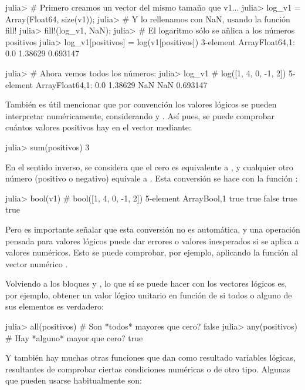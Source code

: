 ﻿\documentclass[spanish]{article}
\begin{document}
julia> # Primero creamos un vector del mismo tamaño que v1...
julia> log_v1 = Array(Float64, size(v1));
julia> # Y lo rellenamos con NaN, usando la función fill!
julia> fill!(log_v1, NaN);
julia> # El logaritmo sólo se añlica a los números positivos
julia> log_v1[positivos] = log(v1[positivos])
3-element Array{Float64,1}:
 0.0
 1.38629
 0.693147

julia> # Ahora vemos todos los números:
julia> log_v1   # log([1, 4, 0, -1, 2])
5-element Array{Float64,1}:
   0.0
   1.38629
 NaN
 NaN
   0.693147

También es útil mencionar que por convención los valores lógicos se pueden interpretar numéricamente, considerando  y . Así pues, se puede comprobar cuántos valores positivos hay en el vector  mediante:

julia> sum(positivos)
3

En el sentido inverso, se considera que el cero es equivalente a , y cualquier otro número (positivo o negativo) equivale a . Esta conversión se hace con la función :

julia> bool(v1)   # bool([1, 4, 0, -1, 2])
5-element Array{Bool,1}
  true
  true
 false
  true
  true

Pero es importante señalar que esta conversión no es automática, y una operación pensada para valores lógicos puede dar errores o valores inesperados si se aplica a valores numéricos. Esto se puede comprobar, por ejemplo, aplicando la función  al vector numérico .

Volviendo a los bloques  y , lo que sí se puede hacer con los vectores lógicos es, por ejemplo, obtener un valor lógico unitario en función de si todos o alguno de sus elementos es verdadero:

julia> all(positivos) # Son *todos* mayores que cero?
false
julia> any(positivos) # Hay *alguno* mayor que cero?
true

Y también hay muchas otras funciones que dan como resultado variables lógicas, resultantes de comprobar ciertas condiciones numéricas o de otro tipo. Algunas que pueden usarse habitualmente son:
\end{document}
